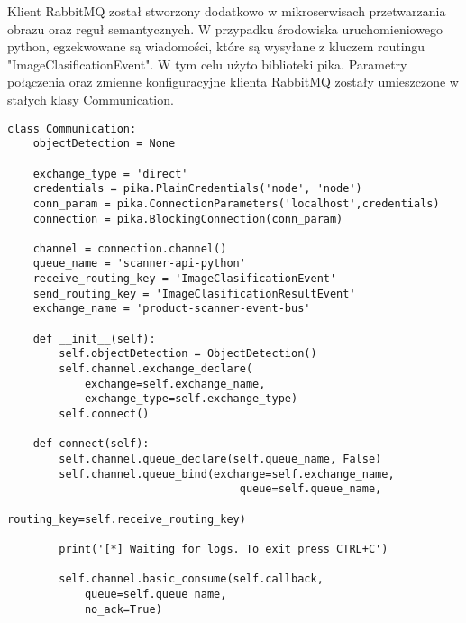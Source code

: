 Klient RabbitMQ został stworzony dodatkowo w mikroserwisach przetwarzania obrazu oraz reguł semantycznych. W przypadku środowiska uruchomieniowego python, egzekwowane są wiadomości, które są wysyłane z kluczem routingu "ImageClasificationEvent". W tym celu użyto biblioteki pika. Parametry połączenia oraz zmienne konfiguracyjne klienta RabbitMQ zostały umieszczone w stałych klasy Communication.

\begin{lstlisting}[caption={Klient RabbitMQ dla mikroserwisu przetwarzania obrazu.}]
class Communication:
	objectDetection = None
	
	exchange_type = 'direct'
	credentials = pika.PlainCredentials('node', 'node')
	conn_param = pika.ConnectionParameters('localhost',credentials)
	connection = pika.BlockingConnection(conn_param)

	channel = connection.channel()
	queue_name = 'scanner-api-python'
	receive_routing_key = 'ImageClasificationEvent'
	send_routing_key = 'ImageClasificationResultEvent'
	exchange_name = 'product-scanner-event-bus'
	
	def __init__(self):
		self.objectDetection = ObjectDetection()
		self.channel.exchange_declare(
			exchange=self.exchange_name,
			exchange_type=self.exchange_type)
		self.connect()
	
	def connect(self):
		self.channel.queue_declare(self.queue_name, False)
		self.channel.queue_bind(exchange=self.exchange_name,
									queue=self.queue_name,
									routing_key=self.receive_routing_key)
	
		print('[*] Waiting for logs. To exit press CTRL+C')
	
		self.channel.basic_consume(self.callback,
			queue=self.queue_name,
			no_ack=True)

\end{lstlisting}

